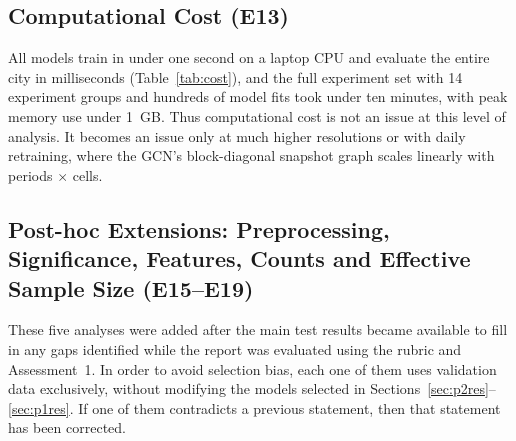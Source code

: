 \documentclass[11pt,a4paper]{report}
\begin{document}
\subsection{Computational Cost (E13)}
\begin{table}[H]
\centering\small
\caption{Measured computational cost (Apple M5 CPU; Phase~2; mean over seeds)}
\label{tab:cost}
\end{table}
All models train in under one second on a laptop CPU and evaluate the entire city in milliseconds (Table~\ref{tab:cost}), and the full experiment set with 14 experiment groups and hundreds of model fits took under ten minutes, with peak memory use under 1~GB. Thus computational cost is not an issue at this level of analysis. It becomes an issue only at much higher resolutions or with daily retraining, where the GCN's block-diagonal snapshot graph scales linearly with periods $\times$ cells.


\subsection{Post-hoc Extensions: Preprocessing, Significance, Features, Counts and Effective Sample Size (E15--E19)}
\label{sec:posthoc}
These five analyses were added after the main test results became available to fill in any gaps identified while the report was evaluated using the rubric and Assessment~1. In order to avoid selection bias, each one of them uses validation data exclusively, without modifying the models selected in Sections~\ref{sec:p2res}--\ref{sec:p1res}. If one of them contradicts a previous statement, then that statement has been corrected.
\end{document}
